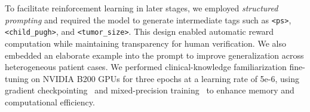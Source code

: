 \documentclass{article}
\begin{document}
To facilitate reinforcement learning in later stages, we employed \emph{structured prompting} and required the model to generate intermediate tags such as \texttt{<ps>}, \texttt{<child\_pugh>}, and \texttt{<tumor\_size>}. This design enabled automatic reward computation while maintaining transparency for human verification. We also embedded an elaborate example into the prompt to improve generalization across heterogeneous patient cases.
We performed clinical-knowledge familiarization fine-tuning on NVIDIA B200 GPUs for three epochs at a learning rate of 5e-6, using gradient checkpointing~\cite{chen_checkpoint_2016} and mixed-precision training~\cite{micikevicius_mixed_2017} to enhance memory and computational efficiency.








\end{document}
